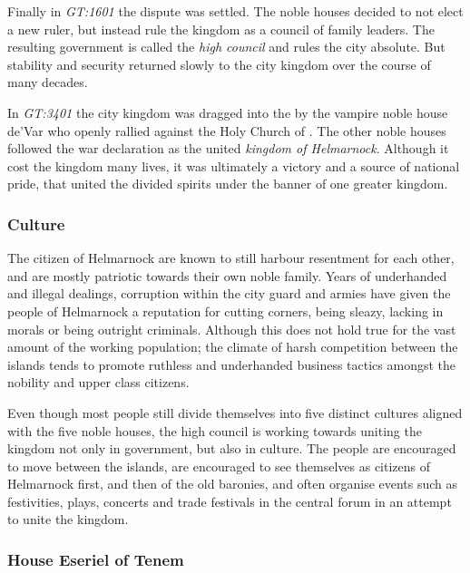 Finally in \emph{GT:1601} the dispute was settled. The noble houses decided
to not elect a new ruler, but instead rule the kingdom as a council of family
leaders. The resulting government is called the \emph{high council} and rules
the city absolute. But stability and security returned slowly to the city
kingdom over the course of many decades.

In \emph{GT:3401} the city kingdom was dragged into the  by the vampire noble house de'Var who openly rallied against the
Holy Church of . The other noble houses followed the war
declaration as the united \emph{kingdom of Helmarnock}. Although it cost the
kingdom many lives, it was ultimately a victory and a source of national
pride, that united the divided spirits under the banner of one greater
kingdom.

\subsubsection{Culture}


The citizen of Helmarnock are known to still harbour resentment for each other,
and are mostly patriotic towards their own noble family. Years of underhanded
and illegal dealings, corruption within the city guard and armies have given
the people of Helmarnock a reputation for cutting corners, being sleazy,
lacking in morals or being outright criminals. Although this does not hold
true for the vast amount of the working population; the climate of harsh
competition between the islands tends to promote ruthless and underhanded
business tactics amongst the nobility and upper class citizens.

Even though most people still divide themselves into five distinct cultures
aligned with the five noble houses, the high council is working towards
uniting the kingdom not only in government, but also in culture. The people
are encouraged to move between the islands, are encouraged to see themselves
as citizens of Helmarnock first, and then of the old baronies, and often
organise events such as festivities, plays, concerts and trade festivals in
the central forum in an attempt to unite the kingdom.

\subsubsection{House Eseriel of Tenem}
\label{sec:House Eseriel}

